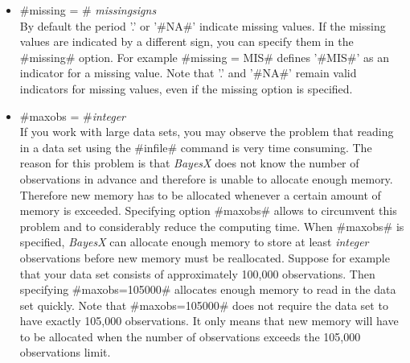 \begin{itemize}
\item #missing = # {\em missingsigns} \\
By default the period '.' or '#NA#' indicate missing values. If
the missing values are indicated by a different sign, you can
specify them in the #missing# option. For example #missing = MIS#
defines '#MIS#' as an indicator for a missing value. Note that
 '.' and '#NA#' remain valid indicators for missing values, even if the missing
option is specified.

\item #maxobs = #{\em integer} \\
If you work with large data sets, you may observe the problem that
reading in a data set using the #infile# command is very time
consuming. The reason for this problem is that {\em BayesX} does
not know the number of observations in advance and therefore is
unable to allocate enough memory. Therefore new memory has to be
allocated whenever a certain amount of memory is exceeded.
Specifying option #maxobs# allows to circumvent this problem and
to considerably reduce the computing time. When #maxobs# is
specified, {\em BayesX} can allocate enough memory to store at
least {\em integer} observations before new memory must be
reallocated. Suppose for example that your data set consists of
approximately 100,000 observations. Then specifying
#maxobs=105000# allocates enough memory to read in the data set
quickly. Note that #maxobs=105000# does not require the data set
to have exactly 105,000 observations. It only means that new
memory will have to be allocated when the number of observations
exceeds the 105,000 observations limit.
\end{itemize}



